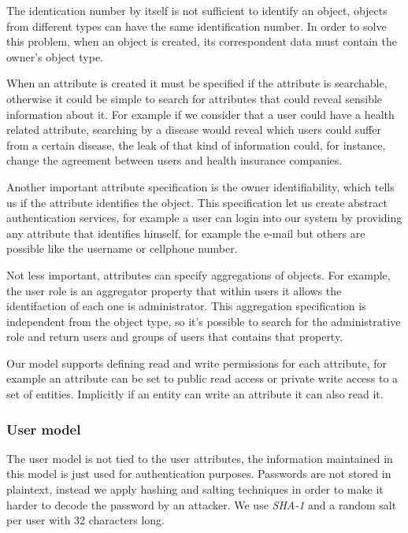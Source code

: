 The identication number by itself is not sufficient to identify an object, objects from different types can have the same identification number. In order to solve this problem, when an object is created, its correspondent data must contain the owner's object type. 

When an attribute is created it must be specified if the attribute is searchable, otherwise it could be simple to search for attributes that could reveal sensible information about it. For example if we consider that a user could have a health related attribute, searching by a disease would reveal which users could suffer from a certain disease, the leak of that kind of information could, for instance, change the agreement between users and health insurance companies.

Another important attribute specification is the owner identifiability, which tells us if the attribute identifies the object. This specification let us create abstract authentication services, for example a user can login into our system by providing any attribute that identifies himself, for example the e-mail but others are possible like the username or cellphone number. 

Not less important, attributes can specify aggregations of objects. For example, the user role is an aggregator property that within users it allows the identifaction of each one is administrator. This aggregation specification is independent from the object type, so it's possible to search for the administrative role and return users and groups of users that contains that property.

Our model supports defining read and write permissions for each attribute, for example an attribute can be set to public read access or private write access to a set of entities. Implicitly if an entity can write an attribute it can also read it.




\subsubsection{User model}

The user model is not tied to the user attributes, the information maintained in this model is just used for authentication purposes. Passwords are not stored in plaintext, instead we apply hashing and salting techniques \cite{password} in order to make it harder to decode the password by an attacker. We use \emph{SHA-1} and a random salt per user with 32 characters long.

